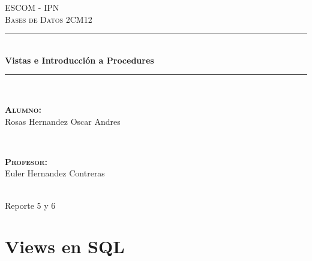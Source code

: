 \documentclass[12pt, fleqn]{article}                             %
\author{Oscar Andrés Rosas}                                     %
\begin{document}
\begin{titlepage}

    \center
    \textsc{\Large ESCOM - IPN}\\[0.5cm] 
    \textsc{\large Bases de Datos 2CM12}\\[1.5cm]

    \rule{\linewidth}{0.5mm} \\[1.0cm]
        { \huge \bfseries Vistas e Introducción a Procedures}\\[1.0cm] 
    \rule{\linewidth}{0.5mm} \\[2.0cm]
     
    \begin{minipage}{0.4\textwidth}
        \begin{flushleft} \large
            \textbf{\textsc{Alumno:}}\\
            Rosas Hernandez Oscar Andres
        \end{flushleft}
    \end{minipage}
    ~
    \begin{minipage}{0.4\textwidth}
        \begin{flushright} \large
            \textbf{\textsc{Profesor: }}\\
            Euler Hernandez Contreras
        \end{flushright}
    \end{minipage}\\[3,5cm]

    {\LARGE Reporte 5 y 6}\\[4cm] 
    
    
    \vfill

\end{titlepage}









\section{Views en SQL}
\end{document}
